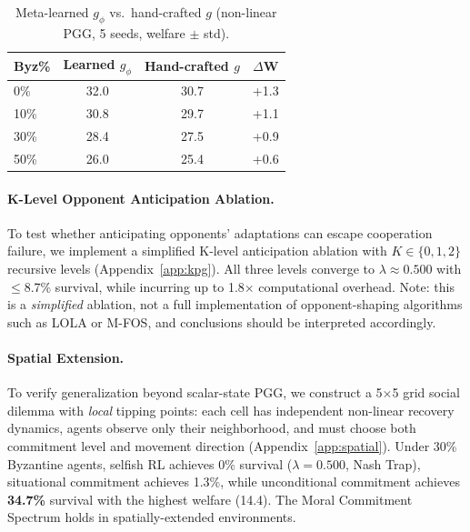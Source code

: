\documentclass{article}
\begin{document}
\begin{table}[t]
\centering
\caption{Meta-learned $g_\phi$ vs.\ hand-crafted $g$ (non-linear PGG, 5 seeds, welfare $\pm$ std).}
\label{tab:meta_learn}
\begin{tabular}{lccc}
\toprule
\textbf{Byz\%} & \textbf{Learned $g_\phi$} & \textbf{Hand-crafted $g$} & \textbf{$\Delta$W} \\
\midrule
0\% & 32.0 & 30.7 & +1.3 \\
10\% & 30.8 & 29.7 & +1.1 \\
30\% & 28.4 & 27.5 & +0.9 \\
50\% & 26.0 & 25.4 & +0.6 \\
\bottomrule
\end{tabular}
\end{table}

\paragraph{K-Level Opponent Anticipation Ablation.}
To test whether anticipating opponents' adaptations can escape cooperation failure, we implement a simplified K-level anticipation ablation with $K \in \{0, 1, 2\}$ recursive levels (Appendix~\ref{app:kpg}).
All three levels converge to $\lambda \approx 0.500$ with $\leq$8.7\% survival, while incurring up to 1.8$\times$ computational overhead.
Note: this is a \emph{simplified} ablation, not a full implementation of opponent-shaping algorithms such as LOLA or M-FOS, and conclusions should be interpreted accordingly.

\paragraph{Spatial Extension.}
To verify generalization beyond scalar-state PGG, we construct a 5$\times$5 grid social dilemma with \emph{local} tipping points: each cell has independent non-linear recovery dynamics, agents observe only their neighborhood, and must choose both commitment level and movement direction (Appendix~\ref{app:spatial}).
Under 30\% Byzantine agents, selfish RL achieves 0\% survival ($\lambda = 0.500$, Nash Trap), situational commitment achieves 1.3\%, while unconditional commitment achieves \textbf{34.7\%} survival with the highest welfare (14.4).
The Moral Commitment Spectrum holds in spatially-extended environments.

\end{document}
